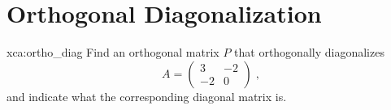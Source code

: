 \section{Orthogonal Diagonalization}

\begin{xca}{xca:ortho_diag}
Find an orthogonal matrix $P$ that orthogonally diagonalizes
$$A = \begin{pmatrix} 3 &-2 \\ -2 &0 \end{pmatrix}\;,$$
and indicate what the corresponding diagonal matrix is.
\end{xca}

